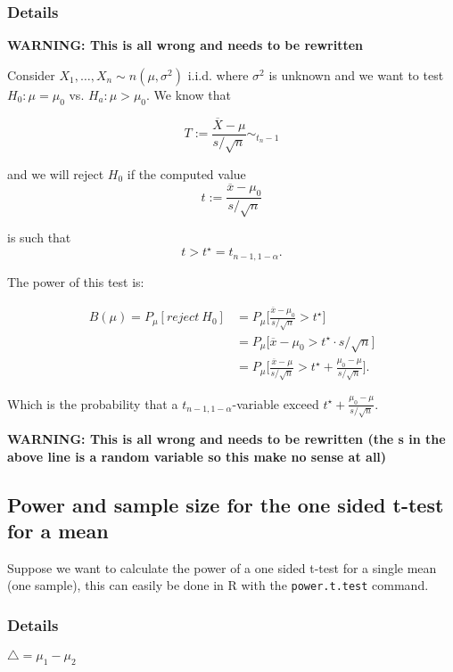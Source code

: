\documentclass[12pt,a4paper]{article}
\theoremstyle{regla}
\theoremstyle{remark}
\theoremstyle{definition}
\theoremstyle{nonumberbreak}
\begin{document}
\subsubsection{Details}
\Large{\textbf{WARNING: This is all wrong and needs to be rewritten}}

Consider $X_1,\ldots,X_n \sim n (\mu, \sigma^2)$ i.i.d. where $\sigma^2$ is unknown and we want to test $H_0:\mu = \mu_0$ vs. $H_a: \mu > \mu_0$.  We know that

$$T:= \frac{\overline{X} - \mu}{s/\sqrt{n}} \sim_{t_n-1}$$

and we will reject $H_0$ if the computed value $$t:= \frac{\overline{x} - \mu_0}{s/\sqrt{n}}$$

is such that $$t>t^{\star}=t_{n-1, 1-\alpha}.$$

The power of this test is:

\begin{align*}
B(\mu) = P_{\mu}[reject\ H_0] &= P_{\mu} \lbrack \frac{\overline{x} - \mu_0}{s/\sqrt{n}} > t^\star \rbrack\\
&=P_{\mu} \lbrack \overline{x} - \mu_0 > t^\star\cdot s/\sqrt{n} \rbrack\\
&=P_{\mu} \lbrack \frac{\overline{x} - \mu}{s/\sqrt{n}} > t^\star+\frac{\mu_0-\mu}{s/\sqrt{n}} \rbrack.
\end{align*}

Which is the probability that a  $t_{n-1,1-\alpha}$-variable exceed $t^{\star}+\frac{\mu_0-\mu}{s/\sqrt{n}}$.

\Large{\textbf{WARNING: This is all wrong and needs to be rewritten (the s in the above line is a random variable so this make no sense at all)}}




\subsection{Power and sample size for the one sided t-test for a mean}
\begin{fbox}
\begin{minipage}{0.97\textwidth}
Suppose we want to calculate the power of a one sided t-test for a single mean (one sample), this can easily be done in R with the \texttt{power.t.test} command.
\end{minipage}
\end{fbox}
\subsubsection{Details}
$\triangle = \mu_1-\mu_2$\\
\end{document}
